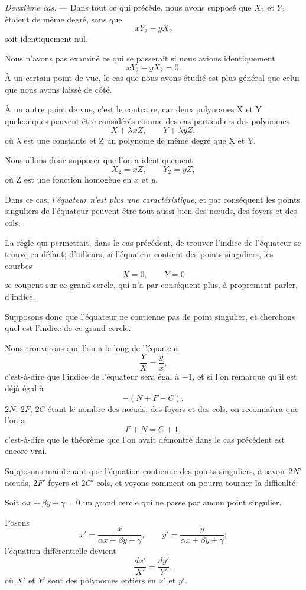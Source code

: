 \documentclass[11pt]{article}
\begin{document}
\emph{Deuxième cas.} --- Dans tout ce qui précède, nous avons supposé que $X_2$ et $Y_2$ étaient de même degré, sans que
\[
xY_2-yX_2
\]
soit identiquement nul.

Nous n’avons pas examiné ce qui se passerait si nous avions identiquement
\[
xY_2-yX_2=0.
\]
À un certain point de vue, le cas que nous avons étudié est plus général que celui que nous avons laissé de côté.

À un autre point de vue, c’est le contraire; car deux polynomes X et Y quelconques peuvent être considérés comme des cas particuliers des polynomes
\[
X+\lambda xZ,
\qquad
Y+\lambda yZ,
\]
où $\lambda$ est une constante et Z un polynome de même degré que X et Y.

Nous allons donc supposer que l’on a identiquement
\[
X_2=xZ,
\qquad
Y_2=yZ,
\]
où Z est une fonction homogène en $x$ et $y$.

Dans ce cas, \emph{l’équateur n’est plus une caractéristique}, et par conséquent les points singuliers de l’équateur peuvent être tout aussi bien des nœuds, des foyers et des cols.

La règle qui permettait, dans le cas précédent, de trouver l’indice de l’équateur se trouve en défaut; d’ailleurs, si l’équateur contient des points singuliers, les courbes
\[
X=0,
\qquad
Y=0
\]
se coupent sur ce grand cercle, qui n’a par conséquent plus, à proprement parler, d’indice.

Supposons donc que l’équateur ne contienne pas de point singulier, et cherchons quel est l’indice de ce grand cercle.

Nous trouverons que l’on a le long de l’équateur
\[
\frac YX=\frac yx,
\]
c’est-à-dire que l’indice de l’équateur sera égal à $-1$, et si l’on remarque qu’il est déjà égal à
\[
-(N+F-C),
\]
$2N$, $2F$, $2C$ étant le nombre des nœuds, des foyers et des cols, on reconnaîtra que l’on a
\[
F+N=C+1,
\]
c’est-à-dire que le théorème que l’on avait démontré dans le cas précédent est encore vrai.

Supposons maintenant que l’équation contienne des points singuliers, à savoir $2N'$ nœuds, $2F'$ foyers et $2C'$ cols, et voyons comment on pourra tourner la difficulté.

Soit $\alpha x+\beta y+\gamma=0$ un grand cercle qui ne passe par aucun point singulier.

Posons
\[
x'=\frac{x}{\alpha x+\beta y+\gamma},
\qquad
 y'=\frac{y}{\alpha x+\beta y+\gamma};
\]
l’équation différentielle devient
\[
\frac{dx'}{X'}=\frac{dy'}{Y'},
\]
où $X'$ et $Y'$ sont des polynomes entiers en $x'$ et $y'$.
\end{document}
